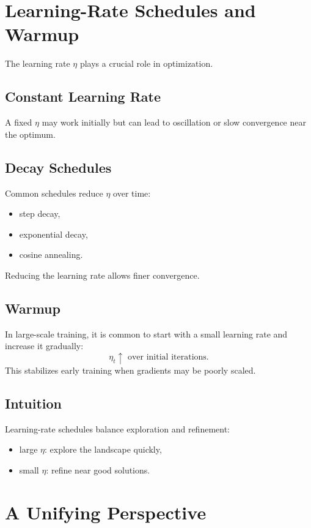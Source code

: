 \section{Learning-Rate Schedules and Warmup}

The learning rate $\eta$ plays a crucial role in optimization.

\subsection{Constant Learning Rate}

A fixed $\eta$ may work initially but can lead to oscillation or slow convergence near the optimum.

\subsection{Decay Schedules}

Common schedules reduce $\eta$ over time:
\begin{itemize}
    \item step decay,
    \item exponential decay,
    \item cosine annealing.
\end{itemize}

Reducing the learning rate allows finer convergence.

\subsection{Warmup}

In large-scale training, it is common to start with a small learning rate and increase it gradually:
\[
\eta_t \uparrow \text{ over initial iterations}.
\]
This stabilizes early training when gradients may be poorly scaled.

\subsection{Intuition}

Learning-rate schedules balance exploration and refinement:
\begin{itemize}
    \item large $\eta$: explore the landscape quickly,
    \item small $\eta$: refine near good solutions.
\end{itemize}

\section{A Unifying Perspective}

